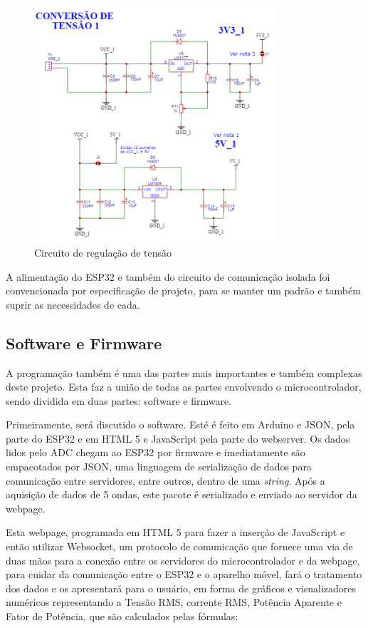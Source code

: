 \begin{figure}[htb!]
    \caption{Circuito de regulação de tensão}
    \label{fig:circ-conv-T}
    \includegraphics[width=0.8\textwidth]{figuras/circ-conv-T.png}
    \fonte{}
\end{figure}

A alimentação do ESP32 e também do circuito de comunicação isolada foi convencionada por especificação de projeto, para se manter um padrão e também suprir as necessidades de cada.

\subsection{Software e Firmware}\label{softfirm}

A programação também é uma das partes mais importantes e também complexas deste projeto. Esta faz a união de todas as partes envolvendo o microcontrolador, sendo dividida em duas partes: software e firmware.

Primeiramente, será discutido o software. Esté é feito em Arduino e JSON, pela parte do ESP32 e em HTML 5 e JavaScript pela parte do webserver. Os dados lidos pelo \gls{ADC} chegam ao ESP32 por firmware e imediatamente são empacotados por JSON, uma linguagem de serialização de dados para comunicação entre servidores, entre outros, dentro de uma \textit{string}. Após a aquisição de dados de 5 ondas, este pacote é serializado e enviado ao servidor da webpage.

Esta webpage, programada em HTML 5 para fazer a inserção de JavaScript e então utilizar Websocket, um protocolo de comunicação que fornece uma via de duas mãos para a conexão entre os servidores do microcontrolador e da webpage, para cuidar da comunicação entre o ESP32 e o aparelho móvel, fará o tratamento dos dados e os apresentará para o usuário, em forma de gráficos e visualizadores numéricos representando a Tensão RMS, corrente RMS, Potência Aparente e Fator de Potência, que são calculados pelas fórmulas:


